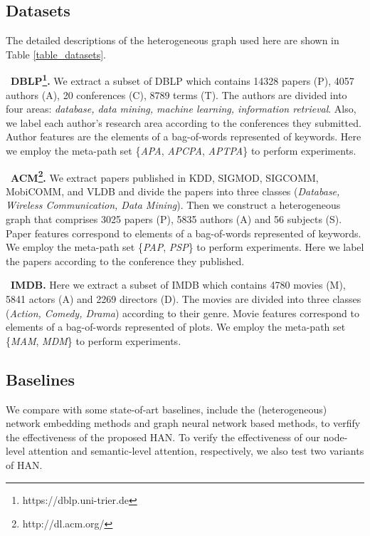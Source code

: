 \subsection{Datasets}
The detailed descriptions of the heterogeneous graph used here are shown in Table \ref{table_datasets}.



\textbullet\	\textbf{DBLP\footnote{https://dblp.uni-trier.de}.} We
	extract a subset of DBLP which contains 14328 papers (P), 4057 authors (A), 20 conferences (C), 8789 terms (T). 
	The authors are divided into four areas: \emph{database, data mining, machine learning, information retrieval}.
Also, we 
	label each author's research area according to the conferences they submitted. 
Author features are the elements of a bag-of-words represented of keywords.
	Here we employ the
	meta-path set \{\emph{APA}, \emph{APCPA}, \emph{APTPA}\} to perform experiments.

\textbullet\
	\textbf{ACM\footnote{http://dl.acm.org/}.} We extract papers published in KDD, 
	SIGMOD, SIGCOMM, MobiCOMM, and VLDB and divide the papers into three classes (\emph{Database, Wireless Communication, Data Mining}). Then we construct a heterogeneous graph that comprises 3025 papers (P), 5835 authors (A) and 
	56 subjects (S). 
	Paper features correspond to elements of a bag-of-words represented of keywords.
	We employ the meta-path set \{\emph{PAP}, \emph{PSP}\} to perform experiments.
	Here we label the papers according to the conference they published.

\textbullet\
	\textbf{IMDB.} 
	Here we extract a subset of IMDB which contains 4780 movies (M), 5841 actors (A) and 2269 directors (D). 
	The movies are divided into three classes (\emph{Action, Comedy, Drama}) according to their genre. Movie features correspond to elements of a bag-of-words represented of plots.
	We employ the meta-path set \{\emph{MAM}, \emph{MDM}\} to perform experiments.









\subsection{Baselines}


We compare with some state-of-art baselines, include the (heterogeneous) network embedding methods and graph neural network based methods, to verfify the effectiveness of the proposed HAN. 
To verify the effectiveness of our node-level attention and semantic-level attention, respectively,
we also test two variants of HAN. 


